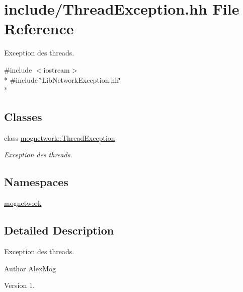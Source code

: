 \hypertarget{_thread_exception_8hh}{\section{include/\-Thread\-Exception.hh File Reference}
\label{_thread_exception_8hh}
}


Exception des threads.  


{\ttfamily \#include $<$iostream$>$}\\*
{\ttfamily \#include \char`\"{}Lib\-Network\-Exception.\-hh\char`\"{}}\\*
\subsection*{Classes}
\begin{DoxyCompactItemize}
\item 
class \hyperlink{classmognetwork_1_1_thread_exception}{mognetwork\-::\-Thread\-Exception}
\begin{DoxyCompactList}\small\item\em Exception des threads. \end{DoxyCompactList}\end{DoxyCompactItemize}
\subsection*{Namespaces}
\begin{DoxyCompactItemize}
\item 
\hyperlink{namespacemognetwork}{mognetwork}
\end{DoxyCompactItemize}


\subsection{Detailed Description}
Exception des threads. \begin{DoxyAuthor}{Author}
Alex\-Mog 
\end{DoxyAuthor}
\begin{DoxyVersion}{Version}
1. 
\end{DoxyVersion}
